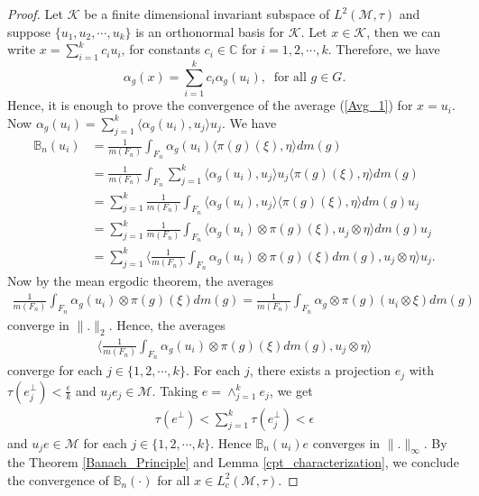 \documentclass[11pt]{amsart}
\theoremstyle{definition}
\theoremstyle{myremark}
\numberwithin{equation}{section}
\def\B{\mathbb B}
\def\C{\mathbb C}
\newcommand{\CK}{\mathcal{K}}
\newcommand{\CM}{\mathcal{M}}
\begin{document}
\begin{proof}
  Let $\CK$ be a finite dimensional invariant subspace of $L^2(\CM, \tau)$ and suppose 
 $\{u_1,u_2,\cdots,u_k\}$ is an orthonormal basis for $\CK$. Let  $x\in \CK$,  then we can write   $x=\displaystyle\sum_{i=1}^kc_iu_i$, for constants $ c_i \in \C$ for $i = 1, 2, \cdots, k$. Therefore, we have 
 $$\alpha_g(x)= \displaystyle\sum_{i=1}^kc_i\alpha_g(u_i), ~ \text{ for all } g \in G.
 $$
 Hence, it is enough to prove the convergence of the average (\ref{Avg_1}) for $x=u_i$. Now $\alpha_g(u_i)=\displaystyle \sum_{j=1}^k \langle \alpha_g(u_i),u_j\rangle u_j.$
 We have \begin{align*}
     \B_n(u_i)&= \frac{1}{m(F_n)} \int_{F_n} \alpha_g(u_i) \langle \pi(g)(\xi), \eta \rangle dm(g)\\
     &= \frac{1}{m(F_n)} \int_{F_n} \displaystyle \sum_{j=1}^k \langle \alpha_g(u_i),u_j\rangle u_j \langle \pi(g)(\xi), \eta \rangle dm(g)\\
     &= \displaystyle \sum_{j=1}^k \frac{1}{m(F_n)} \int_{F_n} \langle \alpha_g(u_i), u_j \rangle \langle \pi(g)(\xi), \eta\rangle dm(g)u_j\\
     &=\displaystyle \sum_{j=1}^k \frac{1}{m(F_n)} \int_{F_n} \langle \alpha_g(u_i)\otimes \pi(g)(\xi), u_j\otimes \eta \rangle dm(g)u_j\\
     &=\displaystyle \sum_{j=1}^k \langle \frac{1}{m(F_n)} \int_{F_n} \alpha_g(u_i)\otimes \pi(g)(\xi) dm(g), u_j\otimes \eta \rangle u_j.
 \end{align*}
 Now by the mean ergodic theorem, the averages
 \begin{align*} \frac{1}{m(F_n)} \int_{F_n} \alpha_g(u_i)\otimes \pi(g)(\xi) dm(g)=\frac{1}{m(F_n)} \int_{F_n} \alpha_g\otimes \pi(g)(u_i\otimes \xi) dm(g)
 \end{align*}
 converge in $\|.\|_2$. Hence, the averages
 \begin{align*}
 \langle \frac{1}{m(F_n)} \int_{F_n} \alpha_g(u_i)\otimes \pi(g)(\xi) dm(g), u_j\otimes \eta \rangle
 \end{align*}
 converge for each $j \in \{1,2, \cdots, k\}$. For each $j$, there exists a projection $e_j$ with $\tau(e_j^\perp)< \frac{\epsilon}{k}$ and $u_je_j \in \CM$. Taking $e=\displaystyle\wedge_{j=1}^k e_j$, we get
 \begin{align*}
\tau(e^\perp) < \displaystyle \sum_{j=1}^k \tau(e_j^\perp) < \epsilon
 \end{align*}
 and $u_je \in \CM$ for each $j \in \{1,2,\cdots, k\}$. Hence  $\B_n(u_i)e$ converges in $\|.\|_\infty$. By the Theorem \ref{Banach_Principle} and Lemma \ref{cpt_characterization}, we conclude the convergence of $\B_n(\cdot)$ for all $x \in L^{2}_c(\CM,\tau).$
\end{proof}
\end{document}

